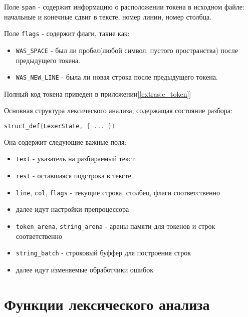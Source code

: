Поле \verb|span| - содержит информацию о расположении токена в исходном файле: начальные и конечные сдвиг в тексте, номер линии, номер столбца.

Поле \verb|flags| - содержит флаги, такие как:
\begin{itemize}
    \item \verb|WAS_SPACE| - был ли пробел(любой символ, пустого пространства) после предыдущего токена.
    \item \verb|WAS_NEW_LINE| - была ли новая строка после предыдущего токена.
\end{itemize}

Полный код токена приведен в приложении[\ref{extras:c_token}]


Основная структура лексического анализа, содержащая состояние разбора:
\begin{lstlisting}[language=c]
struct_def(LexerState, { ... })
\end{lstlisting}

Она содержит следующие важные поля:
\begin{itemize}
  \item \verb|text| - указатель на разбираемый текст
  \item \verb|rest| - оставшаяся подстрока в тексте

  \item \verb|line|, \verb|col|, \verb|flags| - текущие строка, столбец, флаги соответственно
  \item далее идут настройки препроцессора
  
  \item \verb|token_arena|, \verb|string_arena| - арены памяти для токенов и строк соответственно
  \item \verb|string_batch| - строковый буффер для построения строк

  \item далее идут изменяемые обработчики ошибок
\end{itemize}

\section{Функции лексического анализа}
\label{lexing:fns}

